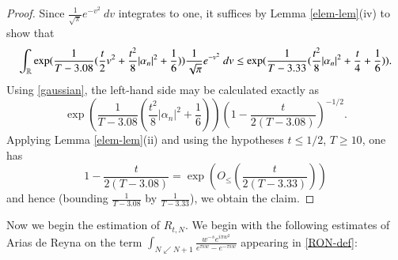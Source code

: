 \begin{proof}
Since $\frac{1}{\sqrt{\pi}} e^{-v^2}\ dv $ integrates to one, it suffices by Lemma \ref{elem-lem}(iv) to show that
\begin{equation}\label{ax}
  \int_{\mathbb{R}} \exp( \frac{1}{T-3.08} (\frac{t}{2}v^2 + \frac{t^2}{8} |\alpha_n|^2 + \frac{1}{6})) \frac{1}{\sqrt{\pi}} e^{-v^2}\ dv \leq \exp( \frac{1}{T-3.33} (\frac{t^2}{8} |\alpha_n|^2 + \frac{t}{4} + \frac{1}{6})).
	\end{equation}
Using \eqref{gaussian}, the left-hand side may be calculated exactly as
$$ \exp( \frac{1}{T-3.08} (\frac{t^2}{8} |\alpha_n|^2 + \frac{1}{6})) (1 - \frac{t}{2(T-3.08)})^{-1/2}.$$
Applying Lemma \ref{elem-lem}(ii) and using the hypotheses $t \leq 1/2$, $T \geq 10$, one has
$$ 1 - \frac{t}{2(T-3.08)} = \exp( O_{\leq}( \frac{t}{2(T-3.33)} ))$$
and hence (bounding $\frac{1}{T-3.08}$ by $\frac{1}{T-3.33}$), we obtain the claim.
\end{proof}

Now we begin the estimation of $R_{t,N}$.  We begin with the following estimates of Arias de Reyna \cite{arias} on the term $\int_{N \swarrow N+1} \frac{w^{-s} e^{i\pi w^2}}{e^{\pi i w} - e^{-\pi i w}}$ appearing in \eqref{RON-def}:

